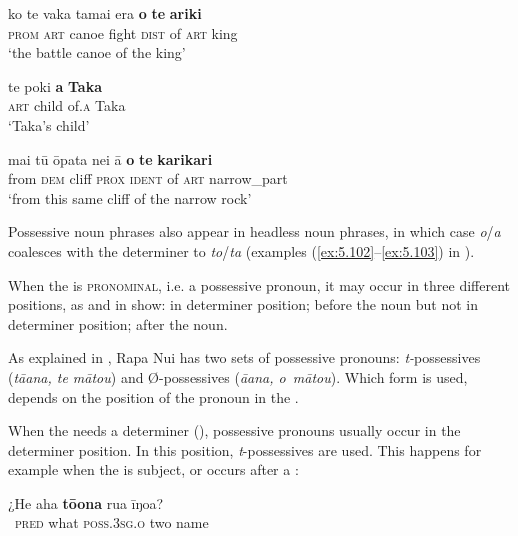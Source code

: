 \ea\label{ex:6.1}
\gll ko te vaka tama{\ꞌ}i era \textbf{o} \textbf{te} \textbf{{\ꞌ}ariki} \\
\textsc{prom} \textsc{art} canoe fight \textsc{dist} of \textsc{art} king \\

\glt 
‘the battle canoe of the king’ \textstyleExampleref{[R345.013]} 
\z

\ea\label{ex:6.2}
\gll te poki \textbf{{\ꞌ}a} \textbf{Taka} \\
\textsc{art} child of\textsc{.a} Taka \\

\glt 
‘Taka’s child’ \textstyleExampleref{[Mtx-3-03.024]}
\z

\ea\label{ex:6.3}
\gll mai tū {\ꞌ}ōpata nei {\ꞌ}ā \textbf{o} \textbf{te} \textbf{karikari} \\
from \textsc{dem} cliff \textsc{prox} \textsc{ident} of \textsc{art} narrow\_part \\

\glt
‘from this same cliff of the narrow rock’ \textstyleExampleref{[R112.011]} 
\z

Possessive noun phrases also appear in headless noun phrases, in which case \textit{o}/\textit{{\ꞌ}a} coalesces with the determiner to \textit{to}/\textit{ta} (examples (\ref{ex:5.102}–\ref{ex:5.103}) in ).

When the  is \textsc{pronominal}, i.e. a possessive pronoun, it may occur in three different positions, as  and  in  show: in determiner position; before the noun but not in determiner position; after the noun.

As explained in , Rapa Nui has two sets of possessive pronouns: \textit{t-}possessives (\textit{tā{\ꞌ}ana, te mātou}) and Ø-possessives (\textit{{\ꞌ}ā{\ꞌ}ana, o~mātou}). Which form is used, depends on the position of the pronoun in the . 

When the  needs a determiner (), possessive pronouns usually occur in the determiner position. In this position, \textit{t}{}-possessives are used. This happens for example when the  is subject, or occurs after a :

\ea\label{ex:6.4}
\gll ¿He aha \textbf{tō{\ꞌ}ona} rua {\ꞌ}īŋoa? \\
~\textsc{pred} what \textsc{poss.3sg.o} two name \\

